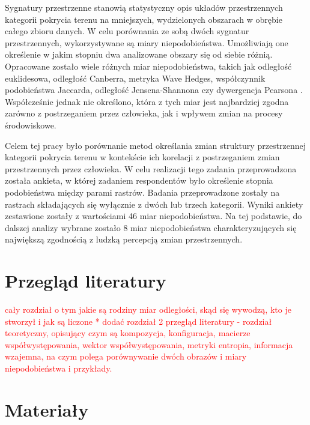 \documentclass{amuthesis}
\begin{document}
Sygnatury przestrzenne stanowią statystyczny opis układów przestrzennych
kategorii pokrycia terenu na mniejszych, wydzielonych obszarach w
obrębie całego zbioru danych. W celu porównania ze sobą dwóch sygnatur
przestrzennych, wykorzystywane są miary niepodobieństwa. Umożliwiają one
określenie w jakim stopniu dwa analizowane obszary się od siebie różnią.
Opracowane zostało wiele różnych miar niepodobieństwa, takich jak
odległość euklidesowa, odległość Canberra, metryka Wave Hedges,
współczynnik podobieństwa Jaccarda, odległość Jensena-Shannona czy
dywergencja Pearsona \autocite{Cha2007}. Współcześnie jednak nie
określono, która z tych miar jest najbardziej zgodna zarówno z
postrzeganiem przez człowieka, jak i wpływem zmian na procesy
środowiskowe.

Celem tej pracy było porównanie metod określania zmian struktury
przestrzennej kategorii pokrycia terenu w kontekście ich korelacji z
postrzeganiem zmian przestrzennych przez człowieka. W celu realizacji
tego zadania przeprowadzona została ankieta, w której zadaniem
respondentów było określenie stopnia podobieństwa między parami rastrów.
Badania przeprowadzone zostały na rastrach składających się wyłącznie z
dwóch lub trzech kategorii. Wyniki ankiety zestawione zostały z
wartościami 46 miar niepodobieństwa. Na tej podstawie, do dalszej
analizy wybrane zostało 8 miar niepodobieństwa charakteryzujących się
największą zgodnością z ludzką percepcją zmian przestrzennych.


\hypertarget{sec-lit}{%
\chapter{Przegląd literatury}\label{sec-lit}}

\textcolor{red}{
cały rozdział o tym jakie są rodziny miar odległości, skąd się wywodzą, kto je stworzył i jak są liczone
* dodać rozdział 2 przegląd literatury - rozdział teoretyczny, opisujący czym są kompozycja, konfiguracja, macierze współwystępowania, wektor współwystępowania, metryki entropia, informacja wzajemna, na czym polega porównywanie dwóch obrazów i miary niepodobieństwa i przykłady.
}


\hypertarget{sec-materialy}{%
\chapter{Materiały}\label{sec-materialy}}
\end{document}
